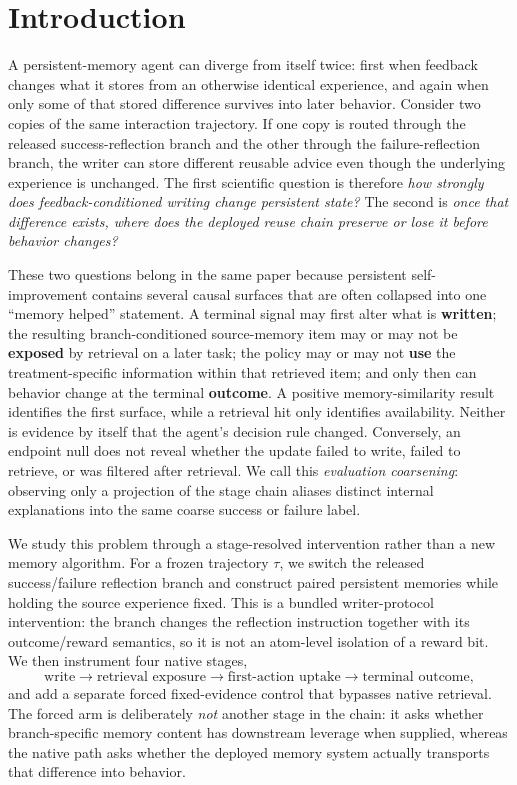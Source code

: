 \section{Introduction}
A persistent-memory agent can diverge from itself twice: first when feedback changes what it stores from an otherwise identical experience, and again when only some of that stored difference survives into later behavior. Consider two copies of the same interaction trajectory. If one copy is routed through the released success-reflection branch and the other through the failure-reflection branch, the writer can store different reusable advice even though the underlying experience is unchanged. The first scientific question is therefore \emph{how strongly does feedback-conditioned writing change persistent state?} The second is \emph{once that difference exists, where does the deployed reuse chain preserve or lose it before behavior changes?}

These two questions belong in the same paper because persistent self-improvement contains several causal surfaces that are often collapsed into one ``memory helped'' statement. A terminal signal may first alter what is \textbf{written}; the resulting branch-conditioned source-memory item may or may not be \textbf{exposed} by retrieval on a later task; the policy may or may not \textbf{use} the treatment-specific information within that retrieved item; and only then can behavior change at the terminal \textbf{outcome}. A positive memory-similarity result identifies the first surface, while a retrieval hit only identifies availability. Neither is evidence by itself that the agent's decision rule changed. Conversely, an endpoint null does not reveal whether the update failed to write, failed to retrieve, or was filtered after retrieval. We call this \emph{evaluation coarsening}: observing only a projection of the stage chain aliases distinct internal explanations into the same coarse success or failure label.

We study this problem through a stage-resolved intervention rather than a new memory algorithm. For a frozen trajectory $\tau$, we switch the released success/failure reflection branch and construct paired persistent memories while holding the source experience fixed. This is a bundled writer-protocol intervention: the branch changes the reflection instruction together with its outcome/reward semantics, so it is not an atom-level isolation of a reward bit. We then instrument four native stages,
\[
\text{write} \rightarrow \text{retrieval exposure} \rightarrow \text{first-action uptake} \rightarrow \text{terminal outcome},
\]
and add a separate forced fixed-evidence control that bypasses native retrieval. The forced arm is deliberately \emph{not} another stage in the chain: it asks whether branch-specific memory content has downstream leverage when supplied, whereas the native path asks whether the deployed memory system actually transports that difference into behavior.

